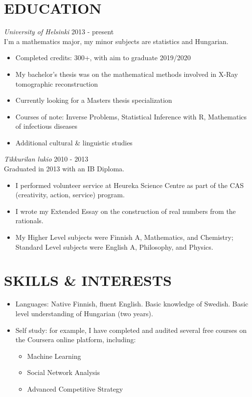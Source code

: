 \documentclass[margin, 10pt]{res} %
\begin{document}
\begin{resume}
\section{EDUCATION}

{\sl University of Helsinki} \hfill 2013 - present\\
I'm a mathematics major, my minor subjects are statistics and Hungarian.
\begin{itemize} \itemsep -2pt
\item Completed credits: 300+, with aim to graduate 2019/2020
\item My bachelor's thesis was on the mathematical methods involved in X-Ray tomographic reconstruction
\item Currently looking for a Masters thesis specialization
\item Courses of note: Inverse Problems, Statistical Inference with R, Mathematics of infectious diseases
\item Additional cultural \& linguistic studies
\end{itemize}
{\sl Tikkurilan lukio} \hfill 2010 - 2013\\
Graduated in 2013 with an IB Diploma.
\begin{itemize} \itemsep -2pt
\item I performed volunteer service at Heureka Science Centre as part of the CAS (creativity, action, service) program.
\item I wrote my Extended Essay on the construction of real numbers from the rationals.
\item My Higher Level subjects were Finnish A, Mathematics, and Chemistry; Standard Level subjects were English A, Philosophy, and Physics. 
\end{itemize}

\section{SKILLS \& INTERESTS}
\begin{itemize} \itemsep -2pt
\item Languages: Native Finnish, fluent English. Basic knowledge of Swedish. Basic level understanding of Hungarian (two years).
\item Self study: for example, I have completed and audited several free courses on the Coursera online platform, including:
  \begin{itemize} \itemsep -2pt
  \item Machine Learning
  \item Social Network Analysis
  \item Advanced Competitive Strategy
  \end{itemize}

\end{itemize}


\end{resume}
\end{document}
